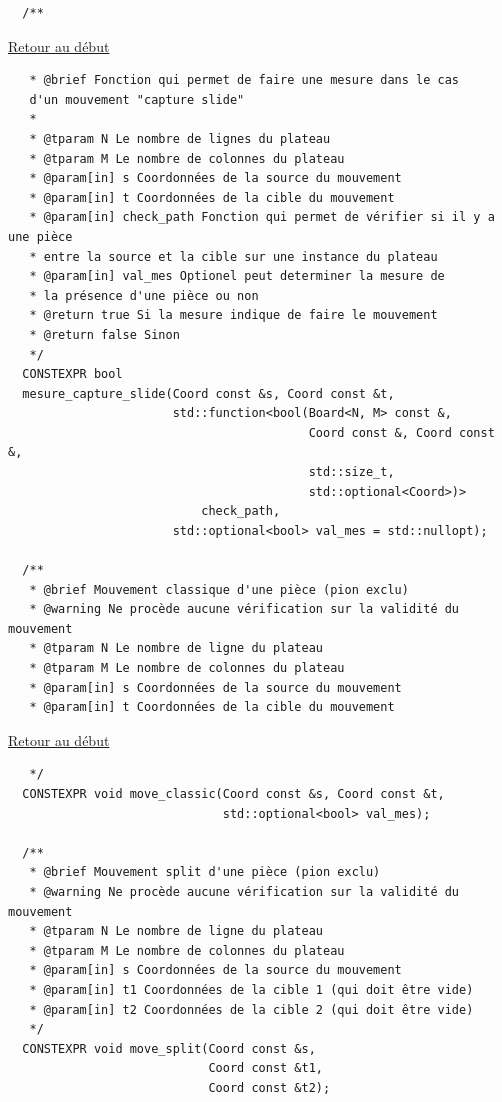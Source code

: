 {\begin{frame}[fragile]
\begin{verbatim}
  /**
\end{verbatim}
\end{frame}

\begin{frame}[fragile]
\hyperlink{conclusion}{Retour au début}\newline
\begin{verbatim}
   * @brief Fonction qui permet de faire une mesure dans le cas
   d'un mouvement "capture slide"
   *
   * @tparam N Le nombre de lignes du plateau
   * @tparam M Le nombre de colonnes du plateau
   * @param[in] s Coordonnées de la source du mouvement
   * @param[in] t Coordonnées de la cible du mouvement
   * @param[in] check_path Fonction qui permet de vérifier si il y a une pièce
   * entre la source et la cible sur une instance du plateau
   * @param[in] val_mes Optionel peut determiner la mesure de
   * la présence d'une pièce ou non
   * @return true Si la mesure indique de faire le mouvement
   * @return false Sinon
   */
  CONSTEXPR bool
  mesure_capture_slide(Coord const &s, Coord const &t,
                       std::function<bool(Board<N, M> const &,
                                          Coord const &, Coord const &,
                                          std::size_t,
                                          std::optional<Coord>)>
                           check_path,
                       std::optional<bool> val_mes = std::nullopt);

  /**
   * @brief Mouvement classique d'une pièce (pion exclu)
   * @warning Ne procède aucune vérification sur la validité du mouvement
   * @tparam N Le nombre de ligne du plateau
   * @tparam M Le nombre de colonnes du plateau
   * @param[in] s Coordonnées de la source du mouvement
   * @param[in] t Coordonnées de la cible du mouvement
\end{verbatim}
\end{frame}

\begin{frame}[fragile]
\hyperlink{conclusion}{Retour au début}\newline
\begin{verbatim}
   */
  CONSTEXPR void move_classic(Coord const &s, Coord const &t,
                              std::optional<bool> val_mes);

  /**
   * @brief Mouvement split d'une pièce (pion exclu)
   * @warning Ne procède aucune vérification sur la validité du mouvement
   * @tparam N Le nombre de ligne du plateau
   * @tparam M Le nombre de colonnes du plateau
   * @param[in] s Coordonnées de la source du mouvement
   * @param[in] t1 Coordonnées de la cible 1 (qui doit être vide)
   * @param[in] t2 Coordonnées de la cible 2 (qui doit être vide)
   */
  CONSTEXPR void move_split(Coord const &s,
                            Coord const &t1,
                            Coord const &t2);


\end{verbatim}
\end{frame}}
